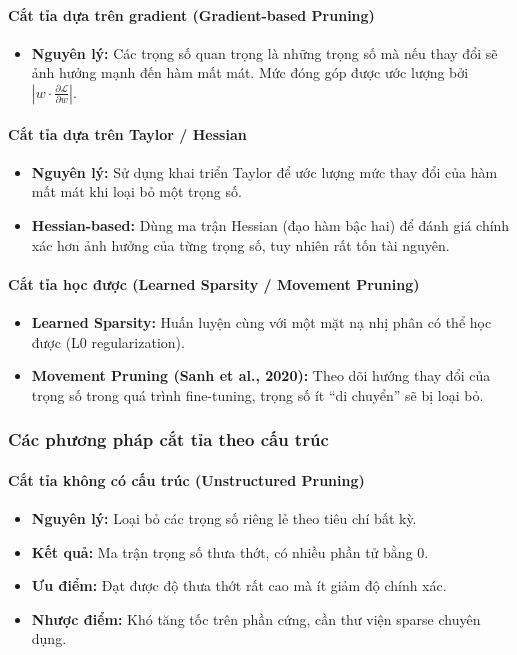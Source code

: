 \paragraph{Cắt tỉa dựa trên gradient (Gradient-based Pruning)}
\begin{itemize}
	\item \textbf{Nguyên lý:} Các trọng số quan trọng là những trọng số mà nếu thay đổi sẽ ảnh hưởng mạnh đến hàm mất mát.
	Mức đóng góp được ước lượng bởi $|w \cdot \frac{\partial \mathcal{L}}{\partial w}|$.
\end{itemize}

\paragraph{Cắt tỉa dựa trên Taylor / Hessian}
\begin{itemize}
	\item \textbf{Nguyên lý:} Sử dụng khai triển Taylor để ước lượng mức thay đổi của hàm mất mát khi loại bỏ một trọng số.
	\item \textbf{Hessian-based:} Dùng ma trận Hessian (đạo hàm bậc hai) để đánh giá chính xác hơn ảnh hưởng của từng trọng số, tuy nhiên rất tốn tài nguyên.
\end{itemize}

\paragraph{Cắt tỉa học được (Learned Sparsity / Movement Pruning)}
\begin{itemize}
	\item \textbf{Learned Sparsity:} Huấn luyện cùng với một mặt nạ nhị phân có thể học được (L0 regularization).
	\item \textbf{Movement Pruning (Sanh et al., 2020):} Theo dõi hướng thay đổi của trọng số trong quá trình fine-tuning, trọng số ít “di chuyển” sẽ bị loại bỏ.
\end{itemize}

\subsubsection{Các phương pháp cắt tỉa theo cấu trúc}

\paragraph{Cắt tỉa không có cấu trúc (Unstructured Pruning)}
\begin{itemize}
	\item \textbf{Nguyên lý:} Loại bỏ các trọng số riêng lẻ theo tiêu chí bất kỳ.
	\item \textbf{Kết quả:} Ma trận trọng số thưa thớt, có nhiều phần tử bằng 0.
	\item \textbf{Ưu điểm:} Đạt được độ thưa thớt rất cao mà ít giảm độ chính xác.
	\item \textbf{Nhược điểm:} Khó tăng tốc trên phần cứng, cần thư viện sparse chuyên dụng.
\end{itemize}

